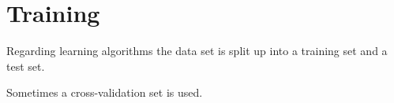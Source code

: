 
\section{Training}\label{sec:theory:training}

Regarding learning algorithms the data set is split up into a training set and a test set.

Sometimes a cross-validation set is used.

